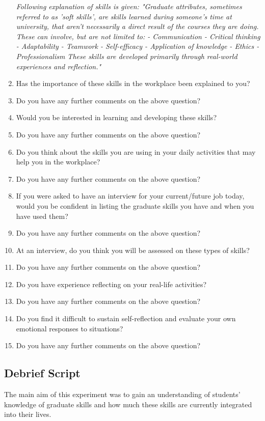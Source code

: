 \documentclass{l4proj}
\begin{document}
\begin{appendices}
\begin{enumerate}
    \textit{Following explanation of skills is given: "Graduate attributes, sometimes referred to as 'soft skills', are skills learned during someone's time at university, that aren't necessarily a direct result of the courses they are doing. These can involve, but are not limited to:
    - Communication
    - Critical thinking
    - Adaptability
    - Teamwork
    - Self-efficacy
    - Application of knowledge
    - Ethics
    - Professionalism 
    These skills are developed primarily through real-world experiences and reflection."}
    \item Has the importance of these skills in the workplace been explained to you?
    \item Do you have any further comments on the above question?
    \item Would you be interested in learning and developing these skills? 
    \item Do you have any further comments on the above question?
    \item Do you think about the skills you are using in your daily activities that may help you in the workplace? 
    \item Do you have any further comments on the above question?
    \item If you were asked to have an interview for your current/future job today, would you be confident in listing the graduate skills you have and when you have used them?
    \item Do you have any further comments on the above question? 
    \item At an interview, do you think you will be assessed on these types of skills?
    \item Do you have any further comments on the above question? 
    \item Do you have experience reflecting on your real-life activities? 
    \item Do you have any further comments on the above question?
    \item Do you find it difficult to sustain self-reflection and evaluate your own emotional responses to situations? 
    \item Do you have any further comments on the above question?
\end{enumerate}

\subsection{Debrief Script}
The main aim of this experiment was to gain an understanding of students' knowledge of graduate skills and how much these skills are currently integrated into their lives. 


\end{appendices}
\end{document}
